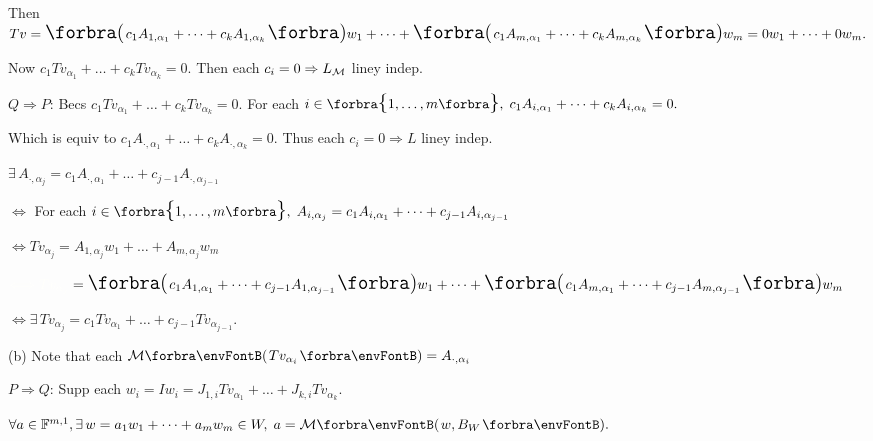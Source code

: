 Then $Tv=\BigPar{c_1A_{1,{\alpha_1}}+\dots+c_kA_{1,{\alpha_k}}}w_1+\dots+\BigPar{c_1A_{m,{\alpha_1}}+\dots+c_kA_{m,{\alpha_k}}}w_m=0w_1+\dots+0w_m.$\par\quad\Ha
{}Now $c_1Tv_{\alpha_1}+\dots+c_kTv_{\alpha_k}=0.$ Then each $c_i=0\Rightarrow L_{\mathcal{M}}$ liney indep.\vspace{4pt}\par\quad\Ha
$Q\Rightarrow P:$\,\;Becs $c_1Tv_{\alpha_1}+\dots+c_kTv_{\alpha_k}=0.$ For each $i\in\Bra{1,\dots,m},\;c_1A_{i,{\alpha_1}}+\dots+c_kA_{i,{\alpha_k}}=0.$\par\quad\Ha
{}Which is equiv to $c_1A_{\cdot,{\alpha_1}}+\dots+c_kA_{\cdot,{\alpha_k}}=0.$ \;Thus each $c_i=0\Rightarrow L$ liney indep.\par\vspace{4pt}\quad\Ha
\Or\;$\exists\,A_{\cdot,{\alpha_j}}=c_1A_{\cdot,{\alpha_1}}+\dots+c_{j-1}A_{\cdot,{\alpha_{j-1}}}$\par\quad\Ha
\Blind{\Or\;}$\Longleftrightarrow$ For each $i\in\Bra{1,\dots,m},\;A_{i,{\alpha_j}}=c_1A_{i,{\alpha_1}}+\dots+c_{j-1}A_{i,{\alpha_{j-1}}}$\par\quad\Ha
\Blind{\Or\;}$\Longleftrightarrow Tv_{\alpha_j}=A_{1,{\alpha_j}}w_1+\dots+A_{m,{\alpha_j}}w_m$\par\vspace{2pt}\quad\Ha
\Blind{\Or\;}$\Blind{\Longleftrightarrow Tv_{\alpha_j}}=\BigPar{c_1A_{1,{\alpha_1}}+\dots+c_{j-1}A_{1,{\alpha_{j-1}}}}w_1+\dots+\BigPar{c_1A_{m,{\alpha_1}}+\dots+c_{j-1}A_{m,{\alpha_{j-1}}}}w_m$\par\vspace{2pt}\quad\Ha
\Blind{\Or\;}$\Longleftrightarrow\exists\,Tv_{\alpha_j}=c_1Tv_{\alpha_1}+\dots+c_{j-1}Tv_{\alpha_{j-1}}.$\par\vspace{6pt}\quad
(b) Note that each $\Mt{Tv_{\alpha_i}}=A_{\cdot,\alpha_i}$\par\quad\Hb
$P\Rightarrow Q:$\,\;Supp each $w_i=Iw_i=J_{1,i}Tv_{\alpha_1}+\dots+J_{k,i}Tv_{\alpha_k}.$\par\quad\Hb
$\forall a\in\Fbb^{m,1},\exists\,w=a_1w_1+\dots+a_mw_m\in W,\;a=\Mt{w,B_W}.$\par\quad\Hb

